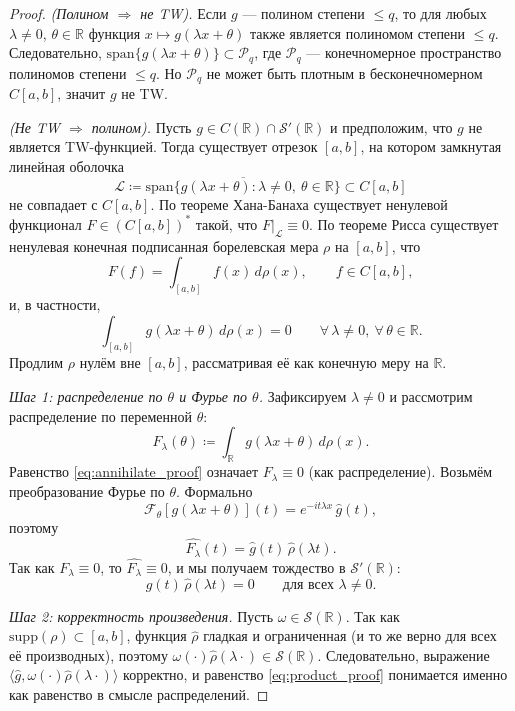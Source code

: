 \documentclass[../NDCNNAI_main.tex]{subfiles}
\begin{document}
\begin{proof}
\emph{(Полином \(\Rightarrow\) не TW).}
Если \(g\) --- полином степени \(\le q\), то для любых \(\lambda\ne 0\), \(\theta\in\mathbb R\)
функция \(x\mapsto g(\lambda x+\theta)\) также является полиномом степени \(\le q\).
Следовательно,
\(\mathrm{span}\{g(\lambda x+\theta)\}\subset \mathcal P_q\),
где \(\mathcal P_q\) --- конечномерное пространство полиномов степени \(\le q\).
Но \(\mathcal P_q\) не может быть плотным в бесконечномерном \(C[a,b]\), значит \(g\) не TW.

\medskip
\emph{(Не TW \(\Rightarrow\) полином).}
Пусть \(g\in C(\mathbb R)\cap \mathcal S'(\mathbb R)\) и предположим, что \(g\) не является TW-функцией.
Тогда существует отрезок \([a,b]\), на котором замкнутая линейная оболочка
\[
\mathcal L\coloneq\overline{\mathrm{span}\{g(\lambda x+\theta):\lambda\ne 0,\ \theta\in\mathbb R\}}
\subset C[a,b]
\]
не совпадает с \(C[a,b]\).
По теореме Хана-Банаха существует ненулевой функционал \(F\in (C[a,b])^*\) такой, что \(F|_{\mathcal{L}}\equiv 0\).
По теореме Рисса существует ненулевая конечная подписанная борелевская мера \(\rho\) на \([a,b]\), что
\[
F(f)=\int_{[a,b]} f(x)\,d\rho(x), \qquad f\in C[a,b],
\]
и, в частности,
\begin{equation}\label{eq:annihilate_proof}
\int_{[a,b]} g(\lambda x+\theta)\,d\rho(x)=0
\qquad \forall\,\lambda\ne 0,\ \forall\,\theta\in\mathbb R.
\end{equation}
Продлим \(\rho\) нулём вне \([a,b]\), рассматривая её как конечную меру на \(\mathbb R\).

\medskip
\emph{Шаг 1: распределение по \(\theta\) и Фурье по \(\theta\).}
Зафиксируем \(\lambda\ne 0\) и рассмотрим распределение по переменной \(\theta\):
\[
F_\lambda(\theta)\coloneq\int_{\mathbb R} g(\lambda x+\theta)\,d\rho(x).
\]
Равенство \eqref{eq:annihilate_proof} означает \(F_\lambda\equiv 0\) (как распределение).
Возьмём преобразование Фурье по \(\theta\). Формально
\[
\mathcal F_\theta[g(\lambda x+\theta)](t)=e^{-it\lambda x}\,\widehat g(t),
\]
поэтому
\[
\widehat{F_\lambda}(t)=\widehat g(t)\,\widehat\rho(\lambda t).
\]
Так как \(F_\lambda\equiv 0\), то \(\widehat{F_\lambda}\equiv 0\), и мы получаем тождество в \(\mathcal S'(\mathbb R)\):
\begin{equation}\label{eq:product_proof}
\widehat g(t)\,\widehat\rho(\lambda t)=0
\qquad \text{для всех }\lambda\ne 0.
\end{equation}

\medskip
\emph{Шаг 2: корректность произведения.}
Пусть \(\omega\in\mathcal S(\mathbb R)\). Так как \(\mathrm{supp}(\rho)\subset[a,b]\), функция \(\widehat\rho\) гладкая и ограниченная
(и то же верно для всех её производных), поэтому \(\omega(\cdot)\widehat\rho(\lambda\cdot)\in\mathcal S(\mathbb R)\).
Следовательно, выражение \(\langle \widehat g,\omega(\cdot)\widehat\rho(\lambda\cdot)\rangle\) корректно,
и равенство \eqref{eq:product_proof} понимается именно как равенство в смысле распределений.


\end{proof}
\end{document}
